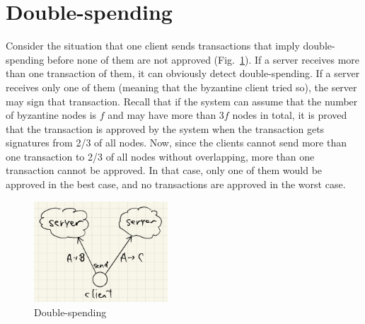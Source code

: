 \documentclass[a4j,10.5pt,uplatex,twocolumn]{article}
\begin{document}
\section{Double-spending}
Consider the situation that one client sends transactions that imply double-spending before none of them are not approved (Fig.~\ref{fig:double-spending-before}).
If a server receives more than one transaction of them, it can obviously detect double-spending.
If a server receives only one of them (meaning that the byzantine client tried so), the server may sign that transaction.
Recall that if the system can assume that the number of byzantine nodes is $f$ and may have more than $3f$ nodes in total, it is proved that the transaction is approved by the system when the transaction gets signatures from 2/3 of all nodes.
Now, since the clients cannot send more than one transaction to 2/3 of all nodes without overlapping, more than one transaction cannot be approved.
In that case, only one of them would be approved in the best case, and no transactions are approved in the worst case.

\begin{figure}[tbp]
    \begin{center}
        \includegraphics[width=5.0cm]{./fig/double-spending-before.jpeg}
        \caption{Double-spending}
        \label{fig:double-spending-before}
    \end{center}
\end{figure}
\end{document}
